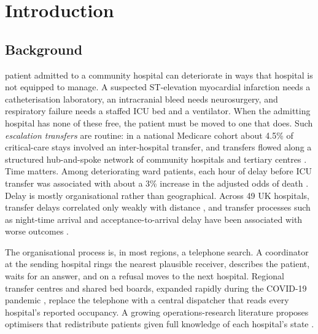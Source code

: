 \section{Introduction}
\label{sec:intro}

\subsection{Background}
 patient admitted to a community hospital can deteriorate in ways that hospital is not equipped to manage. A suspected ST-elevation myocardial infarction needs a catheterisation laboratory, an intracranial bleed needs neurosurgery, and respiratory failure needs a staffed ICU bed and a ventilator. When the admitting hospital has none of these free, the patient must be moved to one that does. Such \emph{escalation transfers} are routine: in a national Medicare cohort about 4.5\% of critical-care stays involved an inter-hospital transfer, and transfers flowed along a structured hub-and-spoke network of community hospitals and tertiary centres \cite{iwashyna2009networks}. Time matters. Among deteriorating ward patients, each hour of delay before ICU transfer was associated with about a 3\% increase in the adjusted odds of death \cite{churpek2016delay}. Delay is mostly organisational rather than geographical. Across 49 UK hospitals, transfer delays correlated only weakly with distance \cite{wong2015delays}, and transfer processes such as night-time arrival and acceptance-to-arrival delay have been associated with worse outcomes \cite{mueller2019transfer}.

The organisational process is, in most regions, a telephone search. A coordinator at the sending hospital rings the nearest plausible receiver, describes the patient, waits for an answer, and on a refusal moves to the next hospital. Regional transfer centres and shared bed boards, expanded rapidly during the COVID-19 pandemic \cite{villarroel2023surgeline}, replace the telephone with a central dispatcher that reads every hospital's reported occupancy. A growing operations-research literature proposes optimisers that redistribute patients given full knowledge of each hospital's state \cite{dijkstra2023balancing,parker2020redistribution,mehrotra2020ventilator}.

